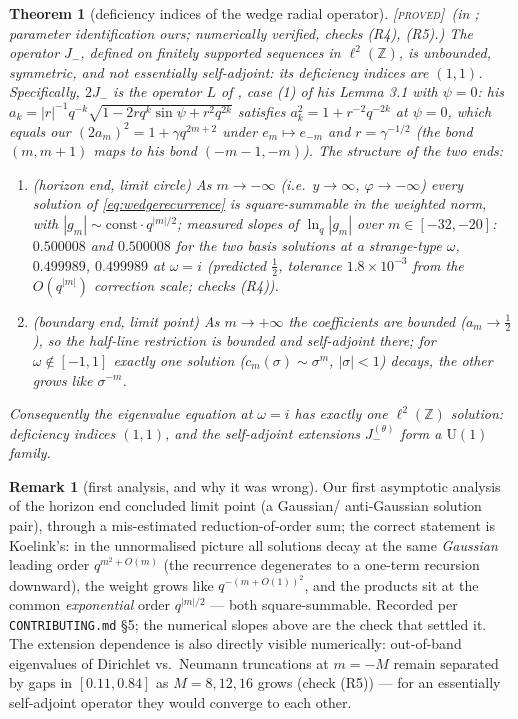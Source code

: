 \documentclass[11pt,a4paper]{article}
\newcommand{\PROVED}{{\color{ForestGreen}\textsc{[proved]}}}
\theoremstyle{definition}
\newtheorem{remark}[definition]{Remark}
\theoremstyle{plain}
\newtheorem{theorem}[definition]{Theorem}
\newcommand{\Z}{\mathbb{Z}}
\begin{document}
\begin{theorem}[deficiency indices of the wedge radial operator]\label{thm:wedgedeficiency}
\PROVED\ (in \cite{Koelink:2003oneparam}; parameter identification ours; numerically
verified, checks (R4), (R5).) The operator $J_{-}$, defined on finitely supported sequences
in $\ell^{2}(\Z)$, is unbounded, symmetric, and \emph{not} essentially self-adjoint: its
deficiency indices are $(1,1)$. Specifically, $2J_{-}$ is the operator $L$ of
\cite{Koelink:2003oneparam}, case (1) of his Lemma 3.1 with $\psi=0$: his
$a_{k}=|r|^{-1}q^{-k}\sqrt{1-2rq^{k}\sin\psi+r^{2}q^{2k}}$ satisfies
$a_{k}^{2}=1+r^{-2}q^{-2k}$ at $\psi=0$, which equals our $(2a_{m})^{2}=1+\gamma q^{2m+2}$
under $e_{m}\mapsto e_{-m}$ and $r=\gamma^{-1/2}$ (the bond $(m,m+1)$ maps to his bond
$(-m-1,-m)$). The structure of the two ends:
\begin{enumerate}[label=(\alph*)]
\item \emph{(horizon end, limit circle)} As $m\to-\infty$ (i.e.\ $y\to\infty$,
$\varphi\to-\infty$) \emph{every} solution of \eqref{eq:wedgerecurrence} is
square-summable in the weighted norm, with $|g_{m}|\sim\mathrm{const}\cdot q^{|m|/2}$;
measured slopes of $\ln_{q}|g_{m}|$ over $m\in[-32,-20]$: $0.500008$ and $0.500008$ for the
two basis solutions at a strange-type $\omega$, $0.499989$, $0.499989$ at $\omega=i$
(predicted $\tfrac12$, tolerance $1.8\times10^{-3}$ from the $O(q^{|m|})$ correction scale;
checks (R4)).
\item \emph{(boundary end, limit point)} As $m\to+\infty$ the coefficients are bounded
($a_{m}\to\tfrac12$), so the half-line restriction is bounded and self-adjoint there; for
$\omega\notin[-1,1]$ exactly one solution ($c_{m}(\sigma)\sim\sigma^{m}$, $|\sigma|<1$)
decays, the other grows like $\sigma^{-m}$.
\end{enumerate}
Consequently the eigenvalue equation at $\omega=i$ has exactly one $\ell^{2}(\Z)$ solution:
deficiency indices $(1,1)$, and the self-adjoint extensions $J_{-}^{(\theta)}$ form a
$\mathrm{U}(1)$ family.
\end{theorem}

\begin{remark}[first analysis, and why it was wrong]\label{rem:deficiencyfirsttry}
Our first asymptotic analysis of the horizon end concluded limit point (a Gaussian/
anti-Gaussian solution pair), through a mis-estimated reduction-of-order sum; the correct
statement is Koelink's: in the unnormalised picture all solutions decay at the same
\emph{Gaussian} leading order $q^{m^{2}+O(m)}$ (the recurrence degenerates to a one-term
recursion downward), the weight grows like $q^{-(m+O(1))^{2}}$, and the products sit at the
common \emph{exponential} order $q^{|m|/2}$ --- both square-summable. Recorded per
\texttt{CONTRIBUTING.md} \S5; the numerical slopes above are the check that settled it.
The extension dependence is also directly visible numerically: out-of-band eigenvalues of
Dirichlet vs.\ Neumann truncations at $m=-M$ remain separated by gaps in $[0.11,0.84]$ as
$M=8,12,16$ grows (check (R5)) --- for an essentially self-adjoint operator they would
converge to each other.
\end{remark}
\end{document}
